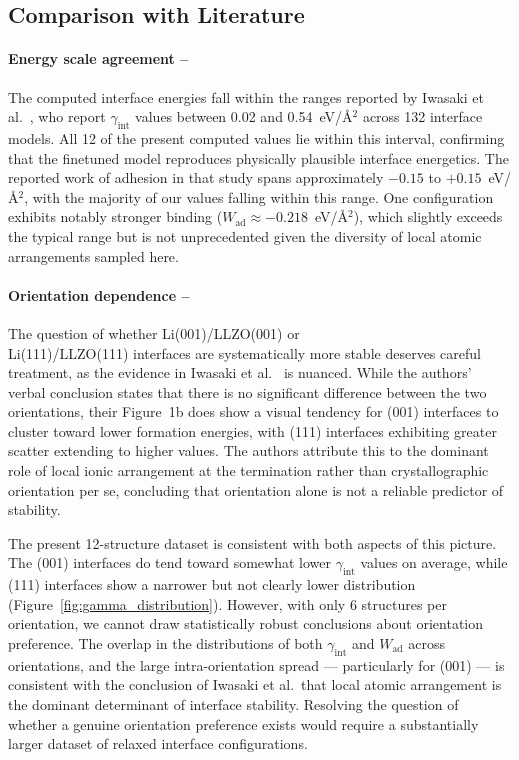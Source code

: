 \documentclass[12pt,a4paper,oneside]{book}
\begin{document}
\subsection{Comparison with Literature}

\paragraph{Energy scale agreement --}
The computed interface energies fall within the ranges reported by Iwasaki et al.~\cite{Iwasaki2022DFT_Li_LLZO_PSSB}, who report $\gamma_{\mathrm{int}}$ values between 0.02 and 0.54~eV/\AA$^2$ across 132 interface models. All 12 of the present computed values lie within this interval, confirming that the finetuned model reproduces physically plausible interface energetics. The reported work of adhesion in that study spans approximately $-0.15$ to $+0.15$~eV/\AA$^2$, with the majority of our values falling within this range. One configuration exhibits notably stronger binding ($W_{\mathrm{ad}} \approx -0.218$~eV/\AA$^2$), which slightly exceeds the typical range but is not unprecedented given the diversity of local atomic arrangements sampled here.

\paragraph{Orientation dependence --}
The question of whether Li(001)/LLZO(001) or \\
Li(111)/LLZO(111) interfaces are systematically more stable deserves careful treatment, as the evidence in Iwasaki et al.~\cite{Iwasaki2022DFT_Li_LLZO_PSSB} is nuanced. While the authors' verbal conclusion states that there is no significant difference between the two orientations, their Figure~1b does show a visual tendency for (001) interfaces to cluster toward lower formation energies, with (111) interfaces exhibiting greater scatter extending to higher values. The authors attribute this to the dominant role of local ionic arrangement at the termination rather than crystallographic orientation per se, concluding that orientation alone is not a reliable predictor of stability.

The present 12-structure dataset is consistent with both aspects of this picture. The (001) interfaces do tend toward somewhat lower $\gamma_{\mathrm{int}}$ values on average, while (111) interfaces show a narrower but not clearly lower distribution (Figure~\ref{fig:gamma_distribution}). However, with only 6 structures per orientation, we cannot draw statistically robust conclusions about orientation preference. The overlap in the distributions of both $\gamma_{\mathrm{int}}$ and $W_{\mathrm{ad}}$ across orientations, and the large intra-orientation spread --- particularly for (001) --- is consistent with the conclusion of Iwasaki et al.\ that local atomic arrangement is the dominant determinant of interface stability. Resolving the question of whether a genuine orientation preference exists would require a substantially larger dataset of relaxed interface configurations.
\end{document}
